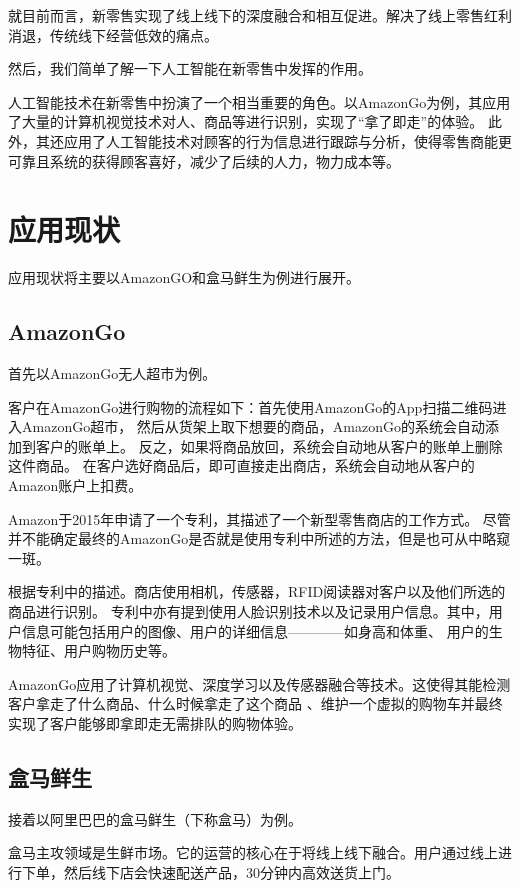 \documentclass[10pt,twocolumn,letterpaper]{article}
\begin{document}
就目前而言，新零售实现了线上线下的深度融合和相互促进。解决了线上零售红利消退，传统线下经营低效的痛点。

然后，我们简单了解一下人工智能在新零售中发挥的作用。

人工智能技术在新零售中扮演了一个相当重要的角色。以AmazonGo为例，其应用了大量的计算机视觉技术对人、商品等进行识别，实现了“拿了即走”的体验。
此外，其还应用了人工智能技术对顾客的行为信息进行跟踪与分析，使得零售商能更可靠且系统的获得顾客喜好，减少了后续的人力，物力成本等。


\section{应用现状}

应用现状将主要以AmazonGO和盒马鲜生为例进行展开。

\subsection{AmazonGo}
首先以AmazonGo无人超市为例。

客户在AmazonGo进行购物的流程如下\cite{AmazonGO主页}：首先使用AmazonGo的App扫描二维码进入AmazonGo超市，
然后从货架上取下想要的商品，AmazonGo的系统会自动添加到客户的账单上。
反之，如果将商品放回，系统会自动地从客户的账单上删除这件商品。
在客户选好商品后，即可直接走出商店，系统会自动地从客户的Amazon账户上扣费。

Amazon于2015年申请了一个专利\cite{AmazonGO专利}，其描述了一个新型零售商店的工作方式。
尽管并不能确定最终的AmazonGo是否就是使用专利中所述的方法，但是也可从中略窥一斑。

根据专利中的描述。商店使用相机，传感器，RFID阅读器对客户以及他们所选的商品进行识别。
专利中亦有提到使用人脸识别技术以及记录用户信息。其中，用户信息可能包括用户的图像、用户的详细信息————如身高和体重、
用户的生物特征、用户购物历史等。

AmazonGo应用了计算机视觉、深度学习以及传感器融合等技术。这使得其能检测客户拿走了什么商品、什么时候拿走了这个商品
、维护一个虚拟的购物车并最终实现了客户能够即拿即走无需排队的购物体验。

\subsection{盒马鲜生}

接着以阿里巴巴的盒马鲜生（下称盒马）为例。

盒马主攻领域是生鲜市场。它的运营的核心在于将线上线下融合。用户通过线上进行下单，然后线下店会快速配送产品，30分钟内高效送货上门。
\end{document}
